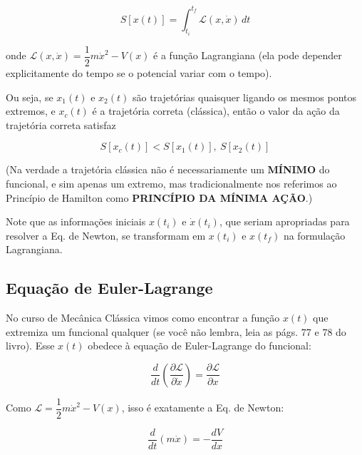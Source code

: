 \begin{equation}
S[x(t)] = \int_{t_i}^{t_f} \mathcal{L}(x, \dot{x})\, dt
\label{eq:aula8_acao}
\end{equation}

onde $\mathcal{L}(x, \dot{x}) = \dfrac{1}{2} m \dot{x}^2 - V(x)$ é a função Lagrangiana (ela pode depender explicitamente do tempo se o potencial variar com o tempo).


Ou seja, se $x_1(t)$ e $x_2(t)$ são trajetórias quaisquer ligando os mesmos pontos extremos, e $x_c(t)$ é a trajetória correta (clássica), então o valor da ação da trajetória correta satisfaz

\begin{equation}
S[x_c(t)] < S[x_1(t)],\ S[x_2(t)]
\label{eq:aula8_minimo}
\end{equation}

(Na verdade a trajetória clássica não é necessariamente um \textbf{MÍNIMO} do funcional, e sim apenas um extremo, mas tradicionalmente nos referimos ao Princípio de Hamilton como \textbf{PRINCÍPIO DA MÍNIMA AÇÃO}.)

Note que as informações iniciais $x(t_i)$ e $\dot{x}(t_i)$, que seriam apropriadas para resolver a Eq. de Newton, se transformam em $x(t_i)$ e $x(t_f)$ na formulação Lagrangiana.

\subsection*{Equação de Euler-Lagrange}

No curso de Mecânica Clássica vimos como encontrar a função $x(t)$ que extremiza um funcional qualquer (se você não lembra, leia as págs. 77 e 78 do livro). Esse $x(t)$ obedece à equação de Euler-Lagrange do funcional:

\begin{equation}
\frac{d}{dt}\left(\frac{\partial \mathcal{L}}{\partial \dot{x}}\right) = \frac{\partial \mathcal{L}}{\partial x}
\label{eq:aula8_euler_lagrange}
\end{equation}

Como $\mathcal{L} = \dfrac{1}{2} m \dot{x}^2 - V(x)$, isso é exatamente a Eq. de Newton:

\begin{equation}
\frac{d}{dt}\left(m\dot{x}\right) = -\frac{dV}{dx}
\label{eq:aula8_el_para_newton}
\end{equation}

